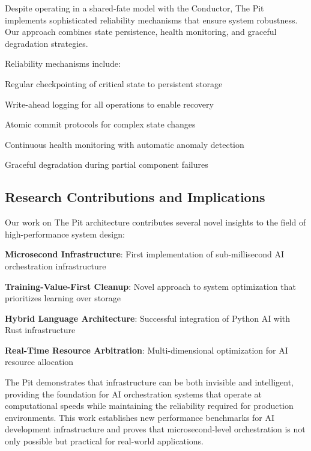 Despite operating in a shared-fate model with the Conductor, The Pit implements sophisticated reliability mechanisms that ensure system robustness. Our approach combines state persistence, health monitoring, and graceful degradation strategies.

Reliability mechanisms include:

\begin{compactlist}
    \item Regular checkpointing of critical state to persistent storage
    \item Write-ahead logging for all operations to enable recovery
    \item Atomic commit protocols for complex state changes
    \item Continuous health monitoring with automatic anomaly detection
    \item Graceful degradation during partial component failures
\end{compactlist}

\subsection*{Research Contributions and Implications}

Our work on The Pit architecture contributes several novel insights to the field of high-performance system design:

\begin{expandedlist}
    \item \textbf{Microsecond Infrastructure}: First implementation of sub-millisecond AI orchestration infrastructure
    \item \textbf{Training-Value-First Cleanup}: Novel approach to system optimization that prioritizes learning over storage
    \item \textbf{Hybrid Language Architecture}: Successful integration of Python AI with Rust infrastructure
    \item \textbf{Real-Time Resource Arbitration}: Multi-dimensional optimization for AI resource allocation
\end{expandedlist}

The Pit demonstrates that infrastructure can be both invisible and intelligent, providing the foundation for AI orchestration systems that operate at computational speeds while maintaining the reliability required for production environments. This work establishes new performance benchmarks for AI development infrastructure and proves that microsecond-level orchestration is not only possible but practical for real-world applications.
